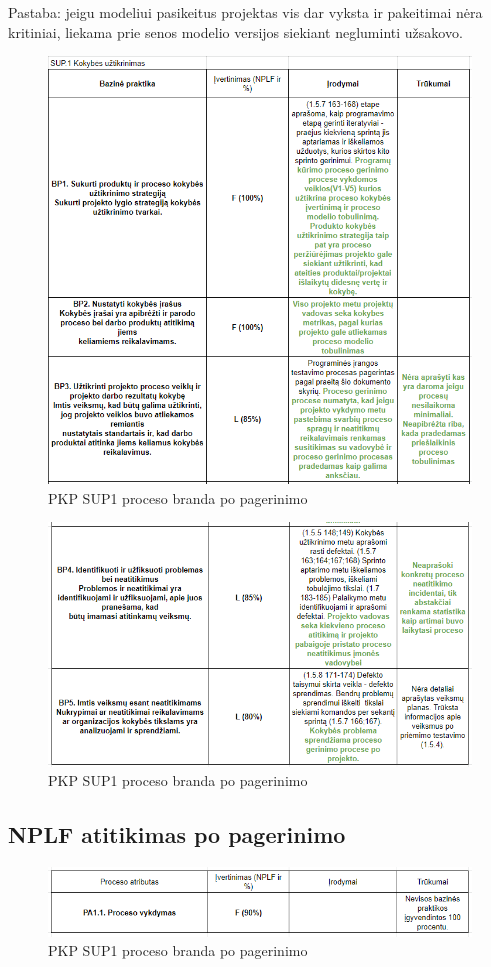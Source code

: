 \documentclass{VUMIFPSkursinis}
\begin{document}
	Pastaba: jeigu modeliui pasikeitus projektas vis dar vyksta ir pakeitimai nėra kritiniai, liekama prie senos modelio versijos siekiant negluminti užsakovo.	

	\begin{figure}[htbp]
		\includegraphics[scale=0.9]{img/sup1one}
		\caption{PKP SUP1 proceso branda po pagerinimo} %
		\label{img:pkpPries}
	\end{figure}	

	\begin{figure}[htbp]
		\includegraphics[scale=0.9]{img/sup1two}
		\caption{PKP SUP1 proceso branda po pagerinimo} %
		\label{img:pkpPries}
	\end{figure}	

	\subsection{NPLF atitikimas po pagerinimo}

	\begin{figure}[htbp]
		\includegraphics[scale=0.9]{img/sup1three}
		\caption{PKP SUP1 proceso branda po pagerinimo} %
		\label{img:pkpPries}
	\end{figure}	
\end{document}
